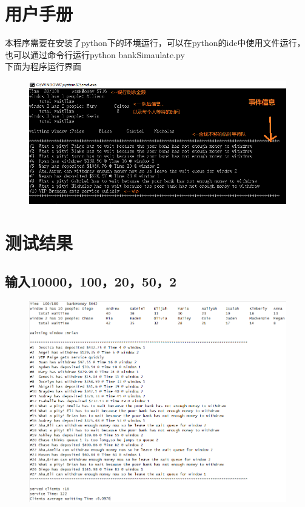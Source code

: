 \documentclass[UTF8]{ctexart}
\begin{document}
\section{用户手册}
本程序需要在安装了python下的环境运行，可以在python的ide中使用文件运行，也可以通过命令行运行python bankSimaulate.py\\
下面为程序运行界面
\begin{figure}[H]
  \centering
  \includegraphics[width=1\textwidth]{demonstrate.png}
\end{figure}
\section{测试结果}
\subsection{输入10000，100，20，50，2}
\begin{figure}[H]
  \centering
  \includegraphics[width=1\textwidth]{result.png}
\end{figure}
\end{document}
